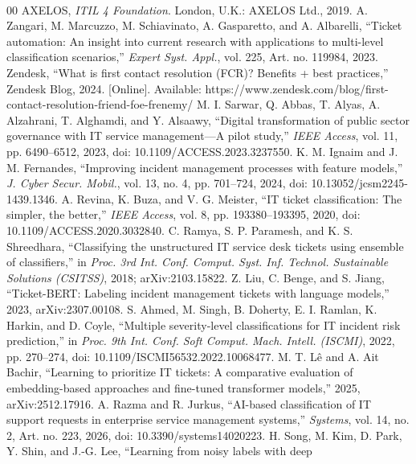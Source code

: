 \documentclass[conference]{IEEEtran}
\begin{document}
\begin{thebibliography}{00}
 AXELOS, \emph{ITIL\textsuperscript{\textregistered} 4 Foundation}. London, U.K.: AXELOS Ltd., 2019.
 A. Zangari, M. Marcuzzo, M. Schiavinato, A. Gasparetto, and A. Albarelli, ``Ticket
automation: An insight into current research with applications to multi-level classification scenarios,''
\emph{Expert Syst. Appl.}, vol. 225, Art. no. 119984, 2023.
 Zendesk, ``What is first contact resolution (FCR)? Benefits + best practices,'' Zendesk Blog,
2024. [Online]. Available: https://www.zendesk.com/blog/first-contact-resolution-friend-foe-frenemy/
 M. I. Sarwar, Q. Abbas, T. Alyas, A. Alzahrani, T. Alghamdi, and Y. Alsaawy, ``Digital
transformation of public sector governance with IT service management---A pilot study,'' \emph{IEEE Access},
vol. 11, pp. 6490--6512, 2023, doi: 10.1109/ACCESS.2023.3237550.
 K. M. Ignaim and J. M. Fernandes, ``Improving incident management processes with feature
models,'' \emph{J. Cyber Secur. Mobil.}, vol. 13, no. 4, pp. 701--724, 2024, doi: 10.13052/jcsm2245-1439.1346.
 A. Revina, K. Buza, and V. G. Meister, ``IT ticket classification: The simpler, the
better,'' \emph{IEEE Access}, vol. 8, pp. 193380--193395, 2020, doi: 10.1109/ACCESS.2020.3032840.
 C. Ramya, S. P. Paramesh, and K. S. Shreedhara, ``Classifying the unstructured IT service
desk tickets using ensemble of classifiers,'' in \emph{Proc. 3rd Int. Conf. Comput. Syst. Inf. Technol.
Sustainable Solutions (CSITSS)}, 2018; arXiv:2103.15822.
 Z. Liu, C. Benge, and S. Jiang, ``Ticket-BERT: Labeling incident management
tickets with language models,'' 2023, arXiv:2307.00108.
 S. Ahmed, M. Singh, B. Doherty, E. I. Ramlan, K. Harkin, and D. Coyle, ``Multiple
severity-level classifications for IT incident risk prediction,'' in \emph{Proc. 9th Int. Conf. Soft Comput.
Mach. Intell. (ISCMI)}, 2022, pp. 270--274, doi: 10.1109/ISCMI56532.2022.10068477.
 M. T. Lê and A. Ait Bachir, ``Learning to prioritize IT tickets: A comparative evaluation of
embedding-based approaches and fine-tuned transformer models,'' 2025, arXiv:2512.17916.
 A. Razma and R. Jurkus, ``AI-based classification of IT support requests in enterprise
service management systems,'' \emph{Systems}, vol. 14, no. 2, Art. no. 223, 2026, doi: 10.3390/systems14020223.
 H. Song, M. Kim, D. Park, Y. Shin, and J.-G. Lee, ``Learning from noisy labels with deep

\end{thebibliography}
\end{document}
